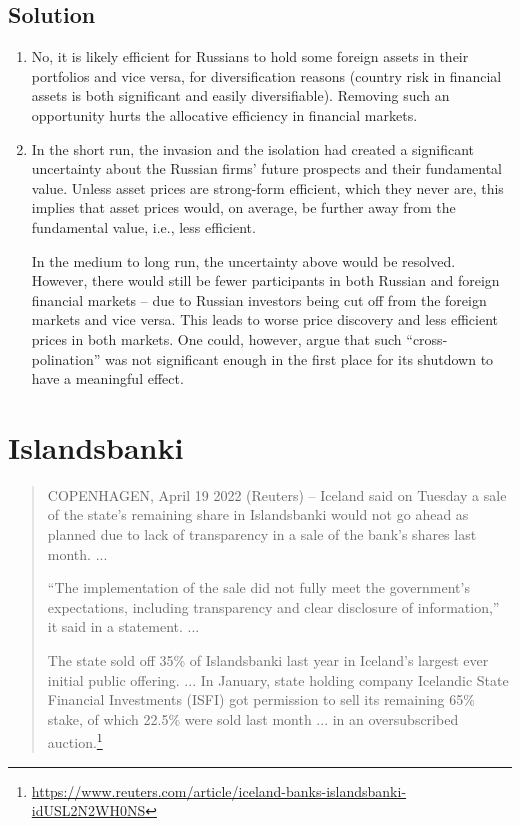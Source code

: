 \documentclass[a4paper]{article}
\begin{document}
\subsection*{Solution}
\begin{enumerate}
	\item No, it is likely efficient for Russians to hold some foreign assets in their portfolios and vice versa, for diversification reasons (country risk in financial assets is both significant and easily diversifiable). Removing such an opportunity hurts the allocative efficiency in financial markets.
	
	\item In the short run, the invasion and the isolation had created a significant uncertainty about the Russian firms' future prospects and their fundamental value. Unless asset prices are strong-form efficient, which they never are, this implies that asset prices would, on average, be further away from the fundamental value, i.e., less efficient.
	
	In the medium to long run, the uncertainty above would be resolved. However, there would still be fewer participants in both Russian and foreign financial markets -- due to Russian investors being cut off from the foreign markets and vice versa. This leads to worse price discovery and less efficient prices in both markets. One could, however, argue that such ``cross-polination'' was not significant enough in the first place for its shutdown to have a meaningful effect.
\end{enumerate}
\fi



\section{Islandsbanki}
	\begin{quote}
		COPENHAGEN, April 19 2022 (Reuters) -- Iceland said on Tuesday a sale of the state’s remaining share in Islandsbanki would not go ahead as planned due to lack of transparency in a sale of the bank’s shares last month.
		...
		
		``The implementation of the sale did not fully meet the government’s expectations, including transparency and clear disclosure of information,'' it said in a statement. ...
		
		The state sold off 35\% of Islandsbanki last year in Iceland’s largest ever initial public offering. ... 
		In January, state holding company Icelandic State Financial Investments (ISFI) got permission to sell its remaining 65\% stake, of which 22.5\% were sold last month ... in an oversubscribed auction.\footnote{\url{https://www.reuters.com/article/iceland-banks-islandsbanki-idUSL2N2WH0NS}}
	\end{quote}
	
\end{document}
